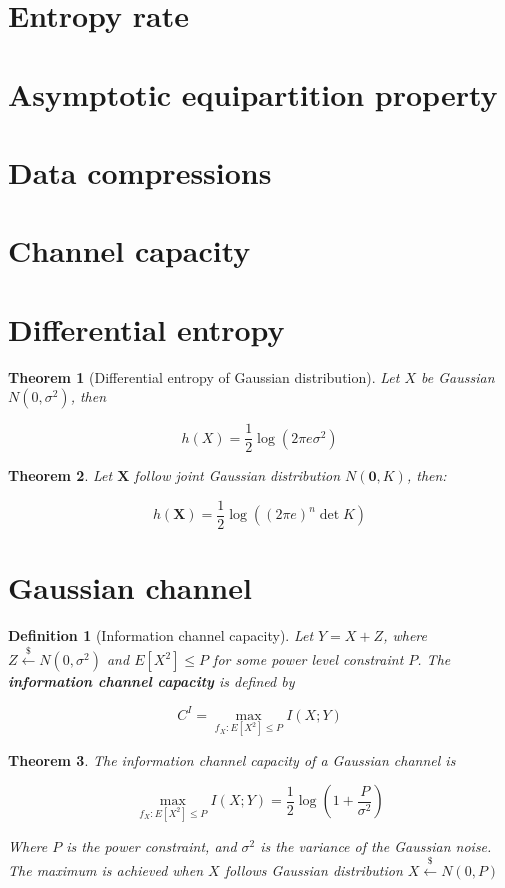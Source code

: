 \documentclass{article}
\newcommand{\leftsample}{\overset{{\scriptscriptstyle\$}}{\leftarrow}}
\newtheorem{definition}{Definition}[section]
\newtheorem{theorem}{Theorem}[section]
\begin{document}
\section{Entropy rate}

\section{Asymptotic equipartition property}

\section{Data compressions}

\section{Channel capacity}

\section{Differential entropy}
\begin{theorem}[Differential entropy of Gaussian distribution]
    Let $X$ be Gaussian $N(0, \sigma^2)$, then

    $$
    h(X) = \frac{1}{2}\log{(2\pi e \sigma^2)}
    $$
\end{theorem}

\begin{theorem}
    Let $\mathbf{X}$ follow joint Gaussian distribution $N(\mathbf{0}, K)$, then:

    \begin{equation*}
        h(\mathbf{X}) = \frac{1}{2}\log ((2\pi e)^n \det{K})
    \end{equation*}
\end{theorem}

\section{Gaussian channel}
\begin{definition}[Information channel capacity]
    Let $Y = X + Z$, where $Z \leftsample N(0, \sigma^2)$ and $E[X^2] \leq P$ for some power level constraint $P$. The \textbf{information channel capacity} is defined by

    $$
    C^I = \max_{f_X : E[X^2] \leq P} I(X; Y)
    $$
\end{definition}

\begin{theorem}
    The information channel capacity of a Gaussian channel is

    \begin{equation}
        \max_{f_X: E[X^2] \leq P} I(X; Y) = \frac{1}{2}\log{(1 + \frac{P}{\sigma^2})}
    \end{equation}

    Where $P$ is the power constraint, and $\sigma^2$ is the variance of the Gaussian noise. The maximum is achieved when $X$ follows Gaussian distribution $X \leftsample N(0, P)$
\end{theorem}
\end{document}
